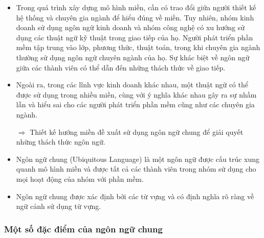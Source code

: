 \begin{itemize}

\item Trong quá trình xây dựng mô hình miền, cần có trao đổi giữa người thiết kế hệ thống và chuyên gia ngành để hiểu đúng về miền. Tuy nhiên, nhóm kinh doanh sử dụng ngôn ngữ kinh doanh và nhóm công nghệ có xu hướng sử dụng các thuật ngữ kỹ thuật trong giao tiếp của họ. Người phát triển phần mềm tập trung vào lớp, phương thức, thuật toán, trong khi chuyên gia ngành thường sử dụng ngôn ngữ chuyên ngành của họ. Sự khác biệt về ngôn ngữ giữa các thành viên có thể dẫn đến những thách thức về giao tiếp.

\item Ngoài ra, trong các lĩnh vực kinh doanh khác nhau, một thuật ngữ có thể được sử dụng trong nhiều miền, cùng với ý nghĩa khác nhau gây ra sự nhầm lẫn và hiểu sai cho các người phát triển phần mềm cũng như các chuyên gia ngành.

$\Rightarrow$ Thiết kế hướng miền đề xuất sử dụng ngôn ngữ chung để giải quyết những thách thức ngôn ngữ.

\item Ngôn ngữ chung (Ubiquitous Language) là một ngôn ngữ được cấu trúc xung quanh mô hình miền và được tất cả các thành viên trong nhóm sử dụng cho mọi hoạt động của nhóm với phần mềm.

\item Ngôn ngữ chung được xác định bởi các từ vựng và có định nghĩa rõ ràng về ngữ cảnh sử dụng từ vựng.

\end{itemize}

\subsubsection{Một số đặc điểm của ngôn ngữ chung}


